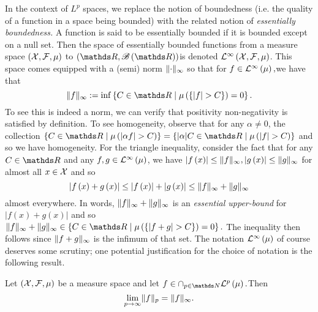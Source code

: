 In the context of $L^{p}$ spaces, we replace the notion of boundedness
(i.e. the quality of a function in a space being bounded) with the
related notion of \emph{essentially boundedness. }A function is said
to be essentially bounded if it is bounded except on a null set. Then
the space of essentially bounded functions from a measure space $\left(\mathcal{X},\mathcal{F},\mu\right)$
to $\left(\R,\borel\left(\R\right)\right)$is denoted $\mathcal{L}^{\infty}\left(\mathcal{X},\mathcal{F},\mu\right)$.
This space comes equipped with a (semi) norm $\lVert\cdot\rVert_{\infty}$
so that for $f\in\mathcal{L}^{\infty}\left(\mu\right),$we have that 
\[
\pnorm f{\infty}:=\inf\left\{ C\in\R\mid\mu\left(\left\{ \lvert f\rvert>C\right\} \right)=0\right\} .
\]
To see this is indeed a norm, we can verify that positivity non-negativity
is satisfied by definition. To see homogeneity, observe that for any
$\alpha\neq0$, the collection $\left\{ C\in\R\mid\mu\left(\lvert\alpha f\rvert>C\right)\right\} =\left\{ \lvert\alpha\rvert C\in\R\mid\mu\left(\lvert f\rvert>C\right)\right\} $
and so we have homogeneity. For the triangle inequality, consider
the fact that for any $C\in\R$ and any $f,g\in\mathcal{L}^{\infty}\left(\mu\right)$,
we have $\lvert f\left(x\right)\rvert\leq\lVert f\rVert_{\infty},\lvert g\left(x\right)\rvert\leq\lVert g\rVert_{\infty}$
for almost all $x\in\mathcal{X}$ and so
\[
\lvert f\left(x\right)+g\left(x\right)\rvert\leq\lvert f\left(x\right)\rvert+\lvert g\left(x\right)\rvert\leq\lVert f\rVert_{\infty}+\lVert g\rVert_{\infty}
\]
almost everywhere. In words, $\lVert f\rVert_{\infty}+\lVert g\rVert_{\infty}$
is an \emph{essential upper-bound }for $\lvert f\left(x\right)+g\left(x\right)\rvert$
and so $\pnorm f{\infty}+\pnorm g{\infty}\in\left\{ C\in\R\mid\mu\left(\left\{ \lvert f+g\rvert>C\right\} \right)=0\right\} .$
The inequality then follows since $\lVert f+g\rVert_{\infty}$ is the infimum
of that set. The notation $\mathcal{L}^{\infty}\left(\mu\right)$ of course deserves some
scrutiny; one potential justification for the choice of notation is
the following result.
\begin{prop}
\label{prop:limLp}Let $\left(\mathcal{X},\mathcal{F},\mu\right)$ be a measure space and let
$f\in\cap_{p\in\N}\Lp p{\mu}.$Then 
\[
\lim_{p\to\infty}\lVert f\rVert_{p}=\lVert f\rVert_{\infty}.
\]
\end{prop}

